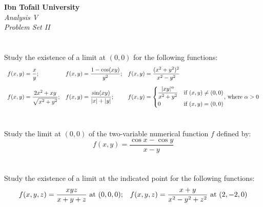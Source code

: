 \documentclass[12pt]{article}
\begin{document}
\begin{center}
\Large\textbf{Ibn Tofail University} \\[1em]
\large\textit{Analysis V} \\[2em]
\large\textit{Problem Set II} \\[0.5em]
\end{center}

\vspace{1cm}
\section{}
Study the existence of a limit at $(0, 0)$ for the following functions:
\[
\begin{array}{lll}
\displaystyle f(x, y) = \dfrac{x}{y}; &
\displaystyle f(x, y) = \dfrac{1 - \cos(xy)}{y^2}; &
\displaystyle f(x, y) = \dfrac{(x^2 + y^2)^2}{x^2 - y^2} \\[1.5em]
\displaystyle f(x, y) = \dfrac{2x^2 + xy}{\sqrt{x^2 + y^2}}; &
\displaystyle f(x, y) = \dfrac{\sin(xy)}{|x| + |y|}; &
\displaystyle f(x, y) = \begin{cases} 
                        \dfrac{|xy|^\alpha}{x^2 + y^2} & \text{if } (x, y) \neq (0, 0) \\[0.5em]
                        0 & \text{if } (x, y) = (0, 0)
                        \end{cases}$, where $\alpha > 0
\end{array}
\]

\begin{correctionbox}

\end{correctionbox}

\section{}
Study the limit at $(0, 0)$ of the two-variable numerical function $f$ defined by:
$$f(x, y) = \frac{\cos x - \cos y}{x - y}$$

\begin{correctionbox}

\end{correctionbox}

\section{}
Study the existence of a limit at the indicated point for the following functions:
\[
\begin{array}{ll}
\displaystyle f(x, y, z) = \dfrac{xyz}{x + y + z}$ at $(0, 0, 0); &
\displaystyle f(x, y, z) = \dfrac{x + y}{x^2 - y^2 + z^2}$ at $(2, -2, 0) 
\end{array}
\]
\end{document}
